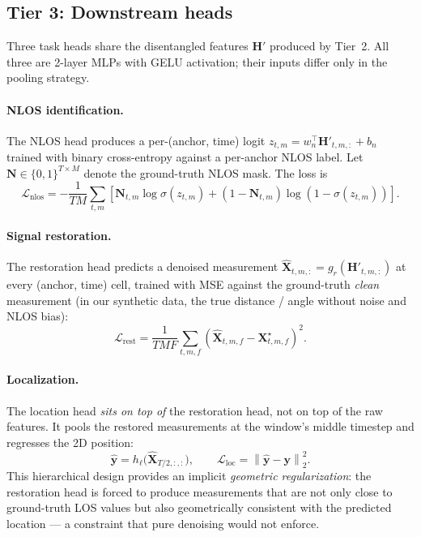 \subsection{Tier 3: Downstream heads}
\label{sec:tier3}

Three task heads share the disentangled features $\bm{H}'$
produced by Tier~2. All three are 2-layer MLPs with GELU
activation; their inputs differ only in the pooling strategy.

\paragraph{NLOS identification.}
The NLOS head produces a per-(anchor, time) logit
$z_{t,m} = w_n^\top \bm{H}'_{t,m,:} + b_n$ trained with binary
cross-entropy against a per-anchor NLOS label. Let
$\bm{N} \in \{0,1\}^{T \times M}$ denote the ground-truth NLOS
mask. The loss is
\begin{equation}
  \mathcal{L}_{\mathrm{nlos}} = -\frac{1}{TM}
  \sum_{t,m} \left[
    \bm{N}_{t,m} \log \sigma(z_{t,m})
    + (1 - \bm{N}_{t,m}) \log(1 - \sigma(z_{t,m}))
  \right].
  \label{eq:nlos}
\end{equation}

\paragraph{Signal restoration.}
The restoration head predicts a denoised measurement
$\hat{\bm{X}}_{t,m,:} = g_r(\bm{H}'_{t,m,:})$ at every
(anchor, time) cell, trained with MSE against the ground-truth
\emph{clean} measurement (in our synthetic data, the true
distance / angle without noise and NLOS bias):
\begin{equation}
  \mathcal{L}_{\mathrm{rest}} = \frac{1}{TMF}
  \sum_{t,m,f} (\hat{\bm{X}}_{t,m,f} - \bm{X}^{\star}_{t,m,f})^2.
  \label{eq:rest}
\end{equation}

\paragraph{Localization.}
The location head \emph{sits on top of} the restoration head,
not on top of the raw features. It pools the restored
measurements at the window's middle timestep and regresses the
2D position:
\begin{equation}
  \hat{\bm{y}} = h_\ell\bigl( \hat{\bm{X}}_{T/2, :,:} \bigr),
  \qquad
  \mathcal{L}_{\mathrm{loc}} = \left\| \hat{\bm{y}} - \bm{y} \right\|_2^2.
  \label{eq:loc}
\end{equation}
This hierarchical design provides an implicit \emph{geometric
regularization}: the restoration head is forced to produce
measurements that are not only close to ground-truth LOS values
but also geometrically consistent with the predicted location ---
a constraint that pure denoising would not enforce.

